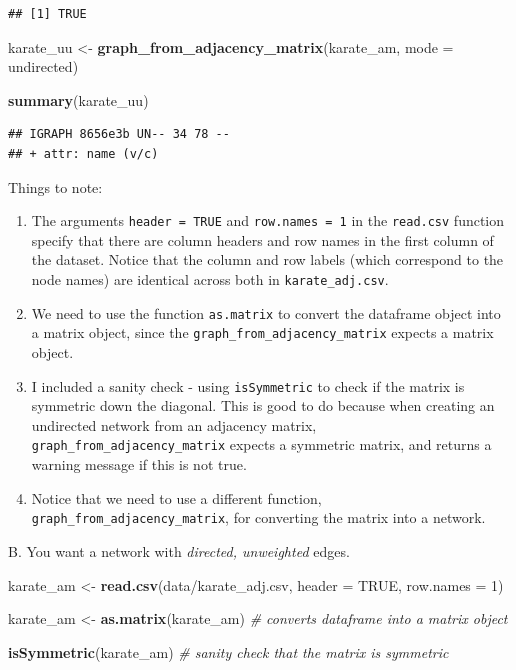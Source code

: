 \documentclass[
]{book}
\newenvironment{Shaded}{\begin{snugshade}}{\end{snugshade}}
\newcommand{\AttributeTok}[1]{\textcolor[rgb]{0.13,0.29,0.53}{#1}}
\newcommand{\CommentTok}[1]{\textcolor[rgb]{0.56,0.35,0.01}{\textit{#1}}}
\newcommand{\ConstantTok}[1]{\textcolor[rgb]{0.56,0.35,0.01}{#1}}
\newcommand{\DecValTok}[1]{\textcolor[rgb]{0.00,0.00,0.81}{#1}}
\newcommand{\FunctionTok}[1]{\textcolor[rgb]{0.13,0.29,0.53}{\textbf{#1}}}
\newcommand{\NormalTok}[1]{#1}
\newcommand{\OtherTok}[1]{\textcolor[rgb]{0.56,0.35,0.01}{#1}}
\newcommand{\StringTok}[1]{\textcolor[rgb]{0.31,0.60,0.02}{#1}}
\providecommand{\tightlist}{%
  \setlength{\itemsep}{0pt}\setlength{\parskip}{0pt}}
\begin{document}
\begin{verbatim}
## [1] TRUE
\end{verbatim}

\begin{Shaded}
\begin{Highlighting}[]
\NormalTok{karate\_uu }\OtherTok{\textless{}{-}} \FunctionTok{graph\_from\_adjacency\_matrix}\NormalTok{(karate\_am, }\AttributeTok{mode =} \StringTok{\textquotesingle{}undirected\textquotesingle{}}\NormalTok{)}

\FunctionTok{summary}\NormalTok{(karate\_uu)}
\end{Highlighting}
\end{Shaded}

\begin{verbatim}
## IGRAPH 8656e3b UN-- 34 78 -- 
## + attr: name (v/c)
\end{verbatim}

Things to note:

\begin{enumerate}
\def\labelenumi{\arabic{enumi}.}
\tightlist
\item
  The arguments \texttt{header\ =\ TRUE} and \texttt{row.names\ =\ 1} in the \texttt{read.csv} function specify that there are column headers and row names in the first column of the dataset. Notice that the column and row labels (which correspond to the node names) are identical across both in \texttt{karate\_adj.csv}.
\item
  We need to use the function \texttt{as.matrix} to convert the dataframe object into a matrix object, since the \texttt{graph\_from\_adjacency\_matrix} expects a matrix object.
\item
  I included a sanity check - using \texttt{isSymmetric} to check if the matrix is symmetric down the diagonal. This is good to do because when creating an undirected network from an adjacency matrix, \texttt{graph\_from\_adjacency\_matrix} expects a symmetric matrix, and returns a warning message if this is not true.
\item
  Notice that we need to use a different function, \texttt{graph\_from\_adjacency\_matrix}, for converting the matrix into a network.
\end{enumerate}

B. You want a network with \emph{directed, unweighted} edges.

\begin{Shaded}
\begin{Highlighting}[]
\NormalTok{karate\_am }\OtherTok{\textless{}{-}} \FunctionTok{read.csv}\NormalTok{(}\StringTok{\textquotesingle{}data/karate\_adj.csv\textquotesingle{}}\NormalTok{, }\AttributeTok{header =} \ConstantTok{TRUE}\NormalTok{, }\AttributeTok{row.names =} \DecValTok{1}\NormalTok{)}

\NormalTok{karate\_am }\OtherTok{\textless{}{-}} \FunctionTok{as.matrix}\NormalTok{(karate\_am) }\CommentTok{\# converts dataframe into a matrix object}

\FunctionTok{isSymmetric}\NormalTok{(karate\_am) }\CommentTok{\# sanity check that the matrix is symmetric }
\end{Highlighting}
\end{Shaded}
\end{document}

